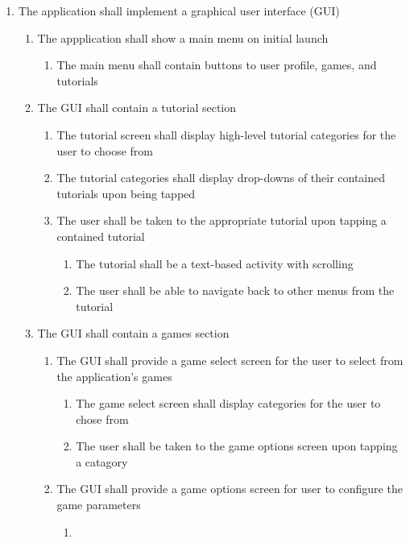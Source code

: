 \documentclass[12pt,letterpaper,oneside]{article}
\begin{document}
\begin{enumerate}
	\item	%
		The application shall implement a graphical user interface (GUI)
		\begin{enumerate}
			\item	%
				The appplication shall show a main menu on initial launch
				\begin{enumerate}
					\item
						The main menu shall contain buttons to user profile, games, and tutorials
				\end{enumerate}
			\item	%
				The GUI shall contain a tutorial section
				\begin{enumerate}
					\item	%
						The tutorial screen shall display high-level tutorial categories for the user to choose from
					\item	%
						The tutorial categories shall display drop-downs of their contained tutorials upon being tapped
					\item	%
						The user shall be taken to the appropriate tutorial upon tapping a contained tutorial
						\begin{enumerate}
							\item
								The tutorial shall be a text-based activity with scrolling
							\item
								The user shall be able to navigate back to other menus from the tutorial
						\end{enumerate}
				\end{enumerate}
			\item
				The GUI shall contain a games section
				\begin{enumerate}
					\item
						The GUI shall provide a game select screen for the user to select from the application's games
						\begin{enumerate}
							\item
								The game select screen shall display categories for the user to chose from
							\item
								The user shall be taken to the game options screen upon tapping a catagory
						\end{enumerate}
					\item
						The GUI shall provide a game options screen for user to configure the game parameters
						\begin{enumerate}
							\item	%

\end{enumerate}
\end{enumerate}
\end{enumerate}
\end{enumerate}
\end{document}
